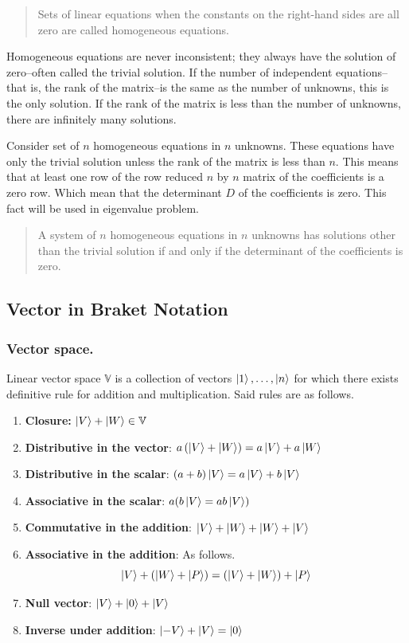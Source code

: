 \documentclass[../../../main.tex]{subfiles}
\begin{document}
\begin{quote}
	Sets of linear equations when the constants on the right-hand sides are all zero are called homogeneous equations.
\end{quote}

Homogeneous equations are never inconsistent; they always have the solution of zero--often called the trivial solution.
If the number of independent equations--that is, the rank of the matrix--is the same as the number of unknowns, this is the only solution.
If the rank of the matrix is less than the number of unknowns, there are infinitely many solutions.

Consider set of $n$ homogeneous equations in $n$ unknowns.
These equations have only the trivial solution unless the rank of the matrix is less than $n$.
This means that at least one row of the row reduced $n$ by $n$ matrix of the coefficients is a zero row.
Which mean that the determinant $D$ of the coefficients is zero.
This fact will be used in eigenvalue problem.

\begin{quote}
	A system of $n$ homogeneous equations in $n$ unknowns has solutions other than the trivial solution if and only if the determinant of the coefficients is zero.
\end{quote}

\subsection{Vector in Braket Notation}
\subsubsection{Vector space.}
Linear vector space $\mathbb{V}$ is a collection of vectors $\ket{1},\dots,\ket{n}$ for which there exists definitive rule for addition and multiplication.
Said rules are as follows.
\begin{enumerate}
	\item \textbf{Closure:} $\ket{V}+\ket{W}\in \mathbb{V}$
	\item \textbf{Distributive in the vector}: $a\left(\ket{V}+\ket{W}\right)=a\ket{V}+a \ket{W}$
	\item \textbf{Distributive in the scalar}: $(a+b)\ket{V}=a \ket{V}+b \ket{V}$
	\item \textbf{Associative in the scalar}: $a(b\ket{V}=ab\ket{V})$
	\item \textbf{Commutative in the addition}: $\ket{V}+\ket{W}+\ket{W}+\ket{V}$
	\item \textbf{Associative in the addition}: As follows.
	      \begin{equation*}
		      \ket{V}+\left(\ket{W}+\ket{P}\right)=\left(\ket{V}+\ket{W}\right)+\ket{P}
	      \end{equation*}
	\item \textbf{Null vector}: $\ket{V}+\ket{0}+\ket{V}$
	\item \textbf{Inverse under addition}: $\ket{-V}+\ket{V}=\ket{0}$
\end{enumerate}
\end{document}
